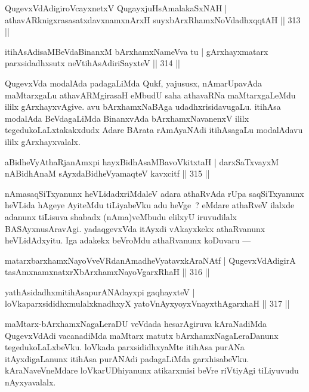 \begin{shl}
QugevxVdAdigiroVcayxnetxV QugayxjuHsAmalakaSxNAH |
athavARknigxrasasatxdavxnamxnArxH suyxbArxRhamxNoVdadhxqqtAH \hfill || 313 ||
\end{shl}

\begin{shl}
itihAsAdisaMBeVdaBinanxM bArxhamxNameVva tu |
gArxhayxmatarx parxsidadhxsutx neVtihAsAdiriSayxteV \hfill || 314 ||
\end{shl}

\begin{artha}
QugevxVda modalAda padagaLiMda Qukf, yajususx, nAmarUpavAda maMtarxgaLu athavARMgirasaH eMbudU saha athavaRNa maMtarxgaLeMdu ililx gArxhayxvAgive. avu bArxhamxNaBAga udadhxrisidavugaLu. itihAsa modalAda BeVdagaLiMda BinanxvAda bArxhamxNavanenxV ililx tegedukoLaLxtakakxdudx Adare BArata rAmAyaNAdi itihAsagaLu modalAdavu ililx gArxhayxvalalx.
\end{artha}


\begin{shl}
aBidheVyAthaRjanAmxpi hayxBidhAsaMBavoVkitxtaH |
darxSaTxvayxM nABidhAnaM sAyxdaBidheVyamaqteV kavxcitf \hfill || 315 ||
\end{shl}

\begin{artha}
nAmasaqSiTxyanunx heVLidadxriMdaleV adara athaRvAda rUpa saqSiTxyanunx heVLida hAgeye AyiteMdu tiLiyabeVku adu heVge~? eMdare athaRveV ilalxde adanunx tiLisuva shabadx (nAma)veMbudu elilxyU iruvudilalx BASAyxnusAravAgi. yadaqgevxVda itAyxdi vAkayxkekx athaRvanunx heVLidAdxyitu. Iga adakekx beVroMdu athaRvanunx koDuvaru  {\rm ---} 
\end{artha}

\begin{shl}
matarxbarxhamxNayoVveVRdanAmadheVyatavxkAraNAtf |
QugevxVdAdigirA tasAmxnamxnatxrXbArxhamxNayoVgarxRhaH \hfill || 316 ||
\end{shl}

\begin{shl}
yathAsidadhxmitihAsapurANAdayxpi gaqhayxteV |
loVkaparxsididhxmulalxknadhxyX yatoV\s nAyxyoyxV\s nayxthAgarxhaH \hfill || 317 ||
\end{shl}

\begin{artha}
maMtarx-bArxhamxNagaLeraDU veVdada hesarAgiruva kAraNadiMda QugevxVdAdi vacanadiMda maMtarx matutx bArxhamxNagaLeraDanunx tegedukoLaLxbeVku. loVkada parxsididhxyaMte itihAsa purANa itAyxdigaLanunx itihAsa purANAdi padagaLiMda garxhisabeVku. kAraNaveVneMdare loVkarUDhiyanunx atikarxmisi beVre riVtiyAgi tiLiyuvudu nAyxyavalalx.
\end{artha}

